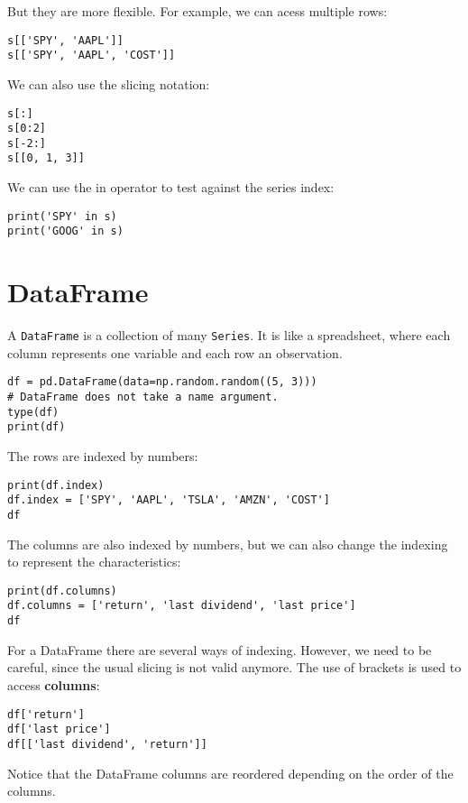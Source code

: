 \documentclass[12pt, a4paper]{article}
\begin{document}
But they are more flexible. For example, we can acess multiple rows:
\lstset{language=jupyter-python,label= ,caption= ,captionpos=b,numbers=none}
\begin{lstlisting}
s[['SPY', 'AAPL']]
s[['SPY', 'AAPL', 'COST']]
\end{lstlisting}

We can also use the slicing notation:
\lstset{language=jupyter-python,label= ,caption= ,captionpos=b,numbers=none}
\begin{lstlisting}
s[:]
s[0:2]
s[-2:]
s[[0, 1, 3]]
\end{lstlisting}

We can use the in operator to test against the series index:
\lstset{language=jupyter-python,label= ,caption= ,captionpos=b,numbers=none}
\begin{lstlisting}
print('SPY' in s)
print('GOOG' in s)
\end{lstlisting}
\section{DataFrame}
\label{sec:orged19280}
A \texttt{DataFrame} is a collection of many \texttt{Series}.
It is like a spreadsheet, where each column represents one variable and each row an observation.

\lstset{language=jupyter-python,label= ,caption= ,captionpos=b,numbers=none}
\begin{lstlisting}
df = pd.DataFrame(data=np.random.random((5, 3)))
# DataFrame does not take a name argument.
type(df)
print(df)
\end{lstlisting}

The rows are indexed by numbers:
\lstset{language=jupyter-python,label= ,caption= ,captionpos=b,numbers=none}
\begin{lstlisting}
print(df.index)
df.index = ['SPY', 'AAPL', 'TSLA', 'AMZN', 'COST']
df
\end{lstlisting}

The columns are also indexed by numbers, but we can also change the indexing to represent the characteristics:
\lstset{language=jupyter-python,label= ,caption= ,captionpos=b,numbers=none}
\begin{lstlisting}
print(df.columns)
df.columns = ['return', 'last dividend', 'last price']
df
\end{lstlisting}

For a DataFrame there are several ways of indexing.
However, we need to be careful, since the usual slicing is not valid anymore.
The use of brackets is used to access \textbf{\textbf{columns}}:
\lstset{language=jupyter-python,label= ,caption= ,captionpos=b,numbers=none}
\begin{lstlisting}
df['return']
df['last price']
df[['last dividend', 'return']]
\end{lstlisting}
Notice that the DataFrame columns are reordered depending on the order of the columns.
\end{document}

